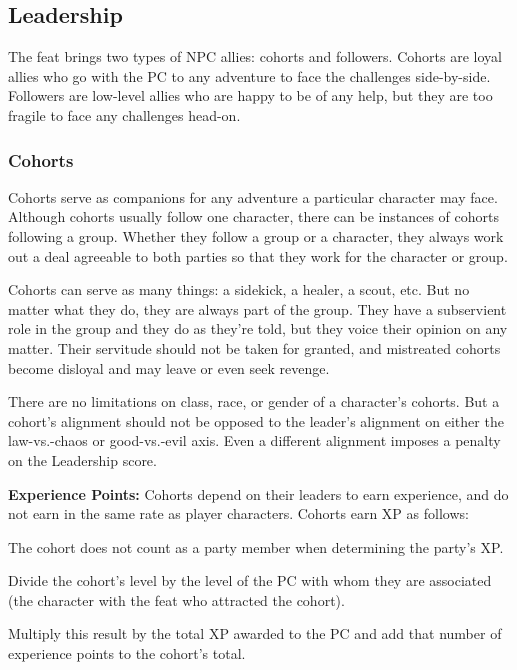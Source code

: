 \subsection{Leadership}
The  feat brings two types of NPC allies: cohorts and followers. Cohorts are loyal allies who go with the PC to any adventure to face the challenges side-by-side. Followers are low-level allies who are happy to be of any help, but they are too fragile to face any challenges head-on.

\subsubsection{Cohorts}
Cohorts serve as companions for any adventure a particular character may face. Although cohorts usually follow one character, there can be instances of cohorts following a group. Whether they follow a group or a character, they always work out a deal agreeable to both parties so that they work for the character or group.

Cohorts can serve as many things: a sidekick, a healer, a scout, etc. But no matter what they do, they are always part of the group. They have a subservient role in the group and they do as they're told, but they voice their opinion on any matter. Their servitude should not be taken for granted, and mistreated cohorts become disloyal and may leave or even seek revenge.

There are no limitations on class, race, or gender of a character's cohorts. But a cohort's alignment should not be opposed to the leader's alignment on either the law-vs.-chaos or good-vs.-evil axis. Even a different alignment imposes a penalty on the Leadership score.

\textbf{Experience Points:} Cohorts depend on their leaders to earn experience, and do not earn in the same rate as player characters. Cohorts earn XP as follows:

\begin{itemize*}
\item The cohort does not count as a party member when determining the party's XP.
\item Divide the cohort's level by the level of the PC with whom they are associated (the character with the  feat who attracted the cohort).
\item Multiply this result by the total XP awarded to the PC and add that number of experience points to the cohort's total.
\end{itemize*}

